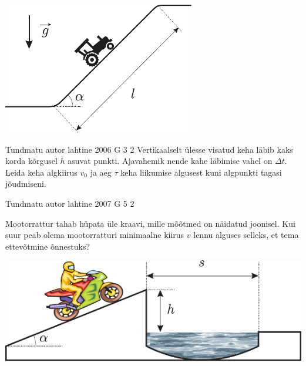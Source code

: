 \documentclass[11pt]{article}
\begin{document}
{{\begin{center}
	\includegraphics[width=0.5\linewidth]{2005-lahg-02-yl}
\end{center}
\fi
}

{Tundmatu autor} %
{lahtine} %
{2006} %
{G 3} %
{2} %
{
\ifStatement
Vertikaalselt ülesse visatud keha läbib kaks korda kõrgusel $h$ asuvat punkti. Ajavahemik nende kahe läbimise vahel on $\Delta t$. Leida keha algkiirus $v_0$ ja aeg $\tau$ keha liikumise algusest kuni algpunkti tagasi jõudmiseni.
\fi
}

{Tundmatu autor} %
{lahtine} %
{2007} %
{G 5} %
{2} %
{
\ifStatement
Mootorrattur tahab hüpata üle kraavi, mille mõõtmed on näidatud joonisel. Kui suur peab olema mootorratturi minimaalne kiirus $v$ lennu alguses selleks, et tema ettevõtmine õnnestuks?

\begin{center}
	\includegraphics[width=0.8\linewidth]{2007-lahg-05-yl}
\end{center}
\fi
}
\newpage


}
\end{document}
